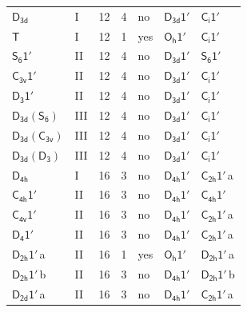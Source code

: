 \documentclass[10pt,a4paper]{article}
\numberwithin{equation}{section}
\newcommand{\grp}[1]{\mathsf{#1}}
\newcommand{\clsletter}[1]{\,{\scriptsize\color{black!55}#1}}
\begin{document}
{\begin{longtable}{@{}llrrlll@{}}
\href{../../../rotation/data/pdf/D3d.pdf}{$\grp{D_{3d}}$} & I & 12 & 4 & no & \href{D3d-1p.pdf}{$\grp{D_{3d}1'}$} & \href{S2-1p.pdf}{$\grp{C_{i}1'}$}\\
\href{../../../rotation/data/pdf/T.pdf}{$\grp{T}$} & I & 12 & 1 & yes & \href{Oh-1p.pdf}{$\grp{O_{h}1'}$} & \href{S2-1p.pdf}{$\grp{C_{i}1'}$}\\
\href{S6-1p.pdf}{$\grp{S_{6}1'}$} & II & 12 & 4 & no & \href{D3d-1p.pdf}{$\grp{D_{3d}1'}$} & \href{S6-1p.pdf}{$\grp{S_{6}1'}$}\\
\href{C3v-1p.pdf}{$\grp{C_{3v}1'}$} & II & 12 & 4 & no & \href{D3d-1p.pdf}{$\grp{D_{3d}1'}$} & \href{S2-1p.pdf}{$\grp{C_{i}1'}$}\\
\href{D3-1p.pdf}{$\grp{D_{3}1'}$} & II & 12 & 4 & no & \href{D3d-1p.pdf}{$\grp{D_{3d}1'}$} & \href{S2-1p.pdf}{$\grp{C_{i}1'}$}\\
\href{D3d-S6.pdf}{$\grp{D_{3d}}(\grp{S_{6}})$} & III & 12 & 4 & no & \href{D3d-1p.pdf}{$\grp{D_{3d}1'}$} & \href{S2-1p.pdf}{$\grp{C_{i}1'}$}\\
\href{D3d-C3v.pdf}{$\grp{D_{3d}}(\grp{C_{3v}})$} & III & 12 & 4 & no & \href{D3d-1p.pdf}{$\grp{D_{3d}1'}$} & \href{S2-1p.pdf}{$\grp{C_{i}1'}$}\\
\href{D3d-D3.pdf}{$\grp{D_{3d}}(\grp{D_{3}})$} & III & 12 & 4 & no & \href{D3d-1p.pdf}{$\grp{D_{3d}1'}$} & \href{S2-1p.pdf}{$\grp{C_{i}1'}$}\\
\href{../../../rotation/data/pdf/D4h.pdf}{$\grp{D_{4h}}$} & I & 16 & 3 & no & \href{D4h-1p.pdf}{$\grp{D_{4h}1'}$} & \href{C2h-1p.pdf}{$\grp{C_{2h}1'}$}\clsletter{a}\\
\href{C4h-1p.pdf}{$\grp{C_{4h}1'}$} & II & 16 & 3 & no & \href{D4h-1p.pdf}{$\grp{D_{4h}1'}$} & \href{C4h-1p.pdf}{$\grp{C_{4h}1'}$}\\
\href{C4v-1p.pdf}{$\grp{C_{4v}1'}$} & II & 16 & 3 & no & \href{D4h-1p.pdf}{$\grp{D_{4h}1'}$} & \href{C2h-1p.pdf}{$\grp{C_{2h}1'}$}\clsletter{a}\\
\href{D4-1p.pdf}{$\grp{D_{4}1'}$} & II & 16 & 3 & no & \href{D4h-1p.pdf}{$\grp{D_{4h}1'}$} & \href{C2h-1p.pdf}{$\grp{C_{2h}1'}$}\clsletter{a}\\
\href{D2h-1p.pdf}{$\grp{D_{2h}1'}$}\clsletter{a} & II & 16 & 1 & yes & \href{Oh-1p.pdf}{$\grp{O_{h}1'}$} & \href{D2h-1p.pdf}{$\grp{D_{2h}1'}$}\clsletter{a}\\
\href{D2h-1p.pdf}{$\grp{D_{2h}1'}$}\clsletter{b} & II & 16 & 3 & no & \href{D4h-1p.pdf}{$\grp{D_{4h}1'}$} & \href{D2h-1p.pdf}{$\grp{D_{2h}1'}$}\clsletter{b}\\
\href{D2d-1p.pdf}{$\grp{D_{2d}1'}$}\clsletter{a} & II & 16 & 3 & no & \href{D4h-1p.pdf}{$\grp{D_{4h}1'}$} & \href{C2h-1p.pdf}{$\grp{C_{2h}1'}$}\clsletter{a}\\

\end{longtable}}
\end{document}
